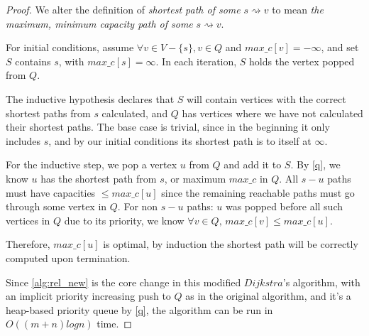 \documentclass{article}
\begin{document}
\begin{proof}
We alter the definition of \textit{shortest path of some} $s \rightsquigarrow v$ to mean \textit{the maximum, minimum capacity path of some} $s \rightsquigarrow v$. 

For initial conditions, assume $\forall v \in V - \{s\}, v \in Q$ and $max\_c[v] = -\infty$, and set $S$ contains $s$, with $max\_c[s] = \infty$. In each iteration, $S$ holds the vertex popped from $Q$. 

The inductive hypothesis declares that $S$ will contain vertices with the correct shortest paths from $s$ calculated, and $Q$ has vertices where we have not calculated their shortest paths. The base case is trivial, since in the beginning it only includes $s$, and by our initial conditions its shortest path is to itself at $\infty$.

For the inductive step, we pop a vertex $u$ from $Q$ and add it to $S$. By \ref{q}, we know $u$ has the shortest path from $s$, or maximum $max\_c$ in $Q$. All $s-u$ paths must have capacities $\leq max\_c[u]$ since the remaining reachable paths must go through some vertex in $Q$. For non $s-u$ paths: $u$ was popped before all such vertices in $Q$ due to its priority, we know $\forall v \in Q, \, max\_c[v] \leq max\_c[u]$.

Therefore, $max\_c[u]$ is optimal, by induction the shortest path will be correctly computed upon termination.

Since \ref{alg:rel_new} is the core change in this modified $Dijkstra$'s algorithm, with an implicit priority increasing push to $Q$ as in the original algorithm, and it's a heap-based priority queue by \ref{q}, the algorithm can be run in $O((m+n)logn)$ time.

\end{proof}
 
\end{document}
